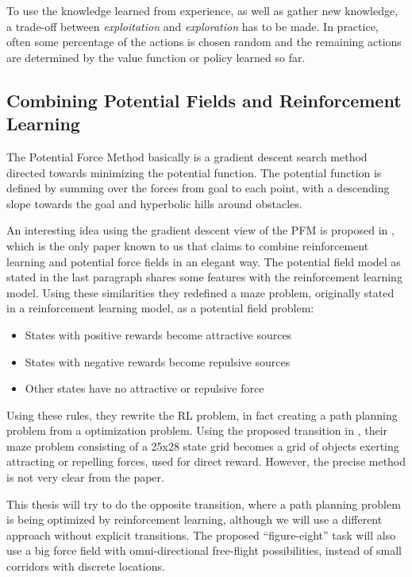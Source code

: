 \documentclass[11pt]{article}
\begin{document}
To use the knowledge learned from experience, as well as gather new knowledge, a trade-off between \emph{exploitation} and \emph{exploration} has to be made. In practice, often some percentage of the actions is chosen random and the remaining actions are determined by the value function or policy learned so far.

\subsection{Combining Potential Fields and Reinforcement Learning}


The Potential Force Method basically is a gradient descent search method directed towards minimizing the potential function. The potential function is defined by summing over the forces from goal to each point, with a descending slope towards the goal and hyperbolic hills around obstacles.

An interesting idea using the gradient descent view of the PFM is proposed in \cite{li-juan08}, which is the only paper known to us that claims to combine reinforcement learning and potential force fields in an elegant way. The potential field model as stated in the last paragraph shares some features with the reinforcement learning model. Using these similarities they redefined a maze problem, originally stated in a reinforcement learning model, as a potential field problem:

\begin{itemize}
 \item States with positive rewards become attractive sources
 \item States with negative rewards become repulsive sources
 \item Other states have no attractive or repulsive force
\end{itemize}

Using these rules, they rewrite the RL problem, in fact creating a path planning problem from a optimization problem. Using the proposed transition in \cite{li-juan08}, their maze problem consisting of a 25x28 state grid becomes a grid of objects exerting attracting or repelling forces, used for direct reward. However, the precise method is not very clear from the paper.

This thesis will try to do the opposite transition, where a path planning problem is being optimized by reinforcement learning, although we will use a different approach without explicit transitions. The proposed ``figure-eight'' task will also use a big force field with omni-directional free-flight possibilities, instead of small corridors with discrete locations.
\end{document}

